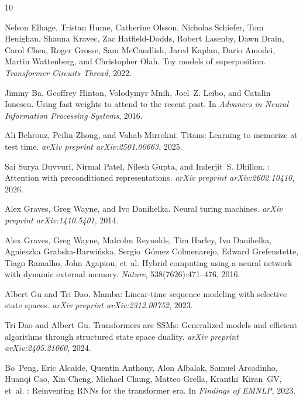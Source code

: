 \documentclass{article}
\begin{document}
\begin{thebibliography}{10}

Nelson Elhage, Tristan Hume, Catherine Olsson, Nicholas Schiefer, Tom Henighan, Shauna Kravec, Zac Hatfield-Dodds, Robert Lasenby, Dawn Drain, Carol Chen, Roger Grosse, Sam McCandlish, Jared Kaplan, Dario Amodei, Martin Wattenberg, and Christopher Olah.
\newblock Toy models of superposition.
\newblock \emph{Transformer Circuits Thread}, 2022.

Jimmy Ba, Geoffrey Hinton, Volodymyr Mnih, Joel~Z. Leibo, and Catalin Ionescu.
\newblock Using fast weights to attend to the recent past.
\newblock In \emph{Advances in Neural Information Processing Systems}, 2016.

Ali Behrouz, Peilin Zhong, and Vahab Mirrokni.
\newblock Titans: Learning to memorize at test time.
\newblock \emph{arXiv preprint arXiv:2501.00663}, 2025.

Sai Surya Duvvuri, Nirmal Patel, Nilesh Gupta, and Inderjit~S. Dhillon.
: Attention with preconditioned representations.
\newblock \emph{arXiv preprint arXiv:2602.10410}, 2026.

Alex Graves, Greg Wayne, and Ivo Danihelka.
\newblock Neural turing machines.
\newblock \emph{arXiv preprint arXiv:1410.5401}, 2014.

Alex Graves, Greg Wayne, Malcolm Reynolds, Tim Harley, Ivo Danihelka,
  Agnieszka Grabska-Barwi{\'n}ska, Sergio~G{\'o}mez Colmenarejo, Edward
  Grefenstette, Tiago Ramalho, John Agapiou, et~al.
\newblock Hybrid computing using a neural network with dynamic external memory.
\newblock \emph{Nature}, 538(7626):471--476, 2016.

Albert Gu and Tri Dao.
\newblock Mamba: Linear-time sequence modeling with selective state spaces.
\newblock \emph{arXiv preprint arXiv:2312.00752}, 2023.

Tri Dao and Albert Gu.
\newblock Transformers are {SSMs}: Generalized models and efficient algorithms through structured state space duality.
\newblock \emph{arXiv preprint arXiv:2405.21060}, 2024.

Bo~Peng, Eric Alcaide, Quentin Anthony, Alon Albalak, Samuel Arcadinho,
  Huanqi Cao, Xin Cheng, Michael Chung, Matteo Grella, Kranthi~Kiran~GV,
  et~al.
: Reinventing {RNN}s for the transformer era.
\newblock In \emph{Findings of EMNLP}, 2023.


\end{thebibliography}
\end{document}
